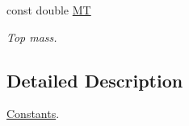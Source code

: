 \begin{DoxyCompactItemize}
\item 
\hypertarget{namespaceConstants_ab9f84b1266addc2e5cba752c68f56a51}{}const double \hyperlink{namespaceConstants_ab9f84b1266addc2e5cba752c68f56a51}{M\+T}\label{namespaceConstants_ab9f84b1266addc2e5cba752c68f56a51}

\begin{DoxyCompactList}\small\item\em Top mass. \end{DoxyCompactList}\end{DoxyCompactItemize}


\subsection{Detailed Description}
\hyperlink{namespaceConstants}{Constants}. 